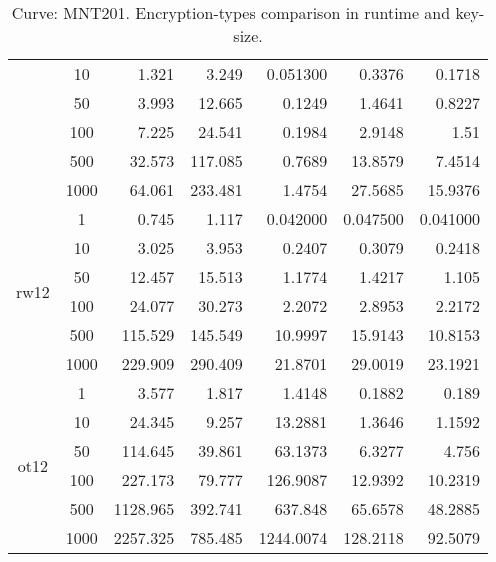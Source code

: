 \documentclass[twoside,11pt,titlepage,a4paper,english,bibliography=totocnumbered,listof=numbered]{scrbook}
\begin{document}
\begin{table}[ht]
{\begin{tabular}{|c|c|r|r|r|r|r|}
&10&    1.321    &    3.249    &    0.051300 &    0.3376   &    0.1718    \\
&50&    3.993    &   12.665    &    0.1249   &    1.4641   &    0.8227    \\
&100&    7.225    &   24.541    &    0.1984   &    2.9148   &    1.51      \\
&500&   32.573    &  117.085    &    0.7689   &   13.8579   &    7.4514    \\
&1000&   64.061    &  233.481    &    1.4754   &   27.5685   &   15.9376    \\
\hline
\multirow{6}{*}{rw12} &1&    0.745    &    1.117    &    0.042000 &    0.047500 &    0.041000  \\
&10&    3.025    &    3.953    &    0.2407   &    0.3079   &    0.2418    \\
&50&   12.457    &   15.513    &    1.1774   &    1.4217   &    1.105     \\
&100&   24.077    &   30.273    &    2.2072   &    2.8953   &    2.2172    \\
&500&  115.529    &  145.549    &   10.9997   &   15.9143   &   10.8153    \\
&1000&  229.909    &  290.409    &   21.8701   &   29.0019   &   23.1921    \\
\hline
\multirow{6}{*}{ot12} &1&    3.577    &    1.817    &    1.4148   &    0.1882   &    0.189     \\
&10&   24.345    &    9.257    &   13.2881   &    1.3646   &    1.1592    \\
&50&  114.645    &   39.861    &   63.1373   &    6.3277   &    4.756     \\
&100&  227.173    &   79.777    &  126.9087   &   12.9392   &   10.2319    \\
&500& 1128.965    &  392.741    &  637.848    &   65.6578   &   48.2885    \\
&1000& 2257.325    &  785.485    & 1244.0074   &  128.2118   &   92.5079    \\
\hline
\end{tabular}}\caption{Curve: MNT201. Encryption-types comparison in runtime and key-size.}\label{table:abe_run_MNT201} \end{table} 
\end{document}

